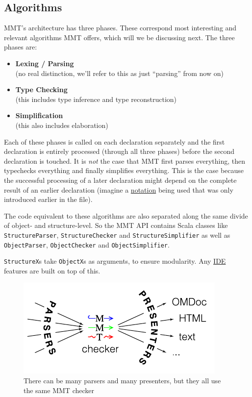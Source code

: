 \documentclass[11pt,a4paper]{article}
\newcommand{\MMT}{\textsf{MMT}\xspace}
\begin{document}
\subsection{Algorithms}

\MMT 's architecture has three phases. These correspond most interesting and relevant algorithms \MMT offers, which will we be discussing next. The three phases are:

\begin{itemize}
\item \textbf{Lexing / Parsing}\\ (no real distinction, we'll refer to this as just ``parsing'' from now on)
\item \textbf{Type Checking}\\ (this includes type inference and type reconstruction)
\item \textbf{Simplification}\\ (this also includes elaboration)
\end{itemize}

Each of these phases is called on each declaration separately and the first declaration is entirely processed (through all three phases) before the second declaration is touched. It is \emph{not} the case that \MMT first parses everything, then typechecks everything and finally simplifies everything. This is the case because the successful processing of a later declaration might depend on the complete result of an earlier declaration (imagine a \href{https://uniformal.github.io/doc/language/declarations.html#notations}{notation} being used that was only introduced earlier in the file).
\bigskip

The code equivalent to these algorithms are also separated along the same divide of object- and structure-level. So the \MMT API contains Scala classes like \texttt{StructureParser}, \texttt{StructureChecker} and \texttt{StructureSimplifier} as well as \texttt{ObjectParser}, \texttt{ObjectChecker} and \texttt{ObjectSimplifier}. 

\texttt{StructureX}s take \texttt{ObjectX}s as arguments, to ensure modularity. Any \href{https://uniformal.github.io/doc/setup/#2-install-an-ide-jedit-or-intellij-idea-if-you-havent-already}{IDE} features are built on top of this.

\begin{figure}[ht]
\centering
\includegraphics[scale=1.5]{parsers-mmt-presenters.pdf}
\caption{There can be many parsers and many presenters, but they all use the same \MMT checker}
\label{fig:mmtbottleneck}
\end{figure}
\end{document}
